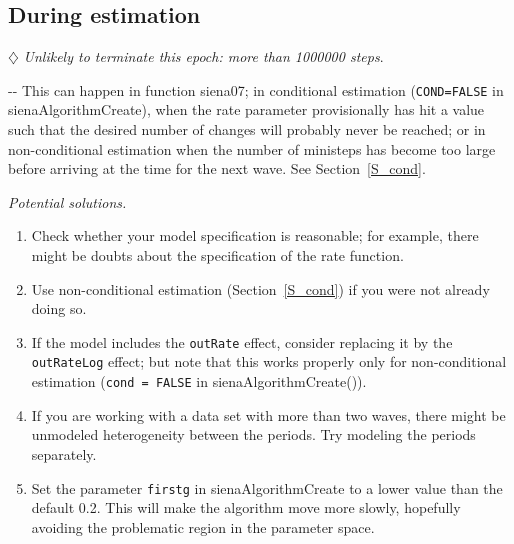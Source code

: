 \documentclass[a4paper,fleqn,11pt]{article}
\makeatletter
\newcommand{\+}{\, + \,}
\newcommand{\sfn}[1]{\textsf{#1}}
\newenvironment{indentation}[2]
{\par \setlength{\leftmargin}{#1}       \setlength{\rightmargin}{#2}
  \advance\linewidth -\leftmargin       \advance\linewidth -\rightmargin
  \advance\@totalleftmargin\leftmargin  \@setpar{{\@@par}}%
  \parshape 1 \@totalleftmargin         \linewidth \ignorespaces}{\par}
\makeatother
\begin{document}
\subsection{During estimation}

$\diamondsuit$
\emph{Unlikely to terminate this epoch: more than 1000000 steps}.
\medskip

\begin{indentation}{0.04\textwidth}{0pt}
\noindent
This can happen in function \sfn{siena07};
in conditional estimation (\texttt{COND=FALSE} in\\
 \sfn{sienaAlgorithmCreate}),
when the rate parameter provisionally has hit a value such that the
desired number of changes will probably never be reached;
or in non-conditional estimation when the number of ministeps has become
too large before arriving at the time for the next wave.
See Section~\ref{S_cond}.

\medskip

\noindent
\emph{Potential solutions.}
\begin{enumerate}
\item Check whether your model specification is reasonable;
    for example, there might be doubts about the specification of the
    rate function.
\item  Use non-conditional estimation (Section~\ref{S_cond}) if you were not
   already doing so.
\item If the model includes the \texttt{outRate} effect, consider
    replacing it by the \texttt{outRateLog} effect;
    but note that this works properly only for non-conditional estimation
    (\texttt{cond = FALSE} in \sfn{sienaAlgorithmCreate()}).
\item If you are working with a data set with more than two waves, there might
   be unmodeled heterogeneity between the periods. Try modeling the periods
   separately.
\item Set the parameter \texttt{firstg} in \sfn{sienaAlgorithmCreate} to a
   lower value than the default 0.2.
   This will make the algorithm move more slowly, hopefully avoiding the problematic region
   in the parameter space.


\end{enumerate}
\end{indentation}
\end{document}
